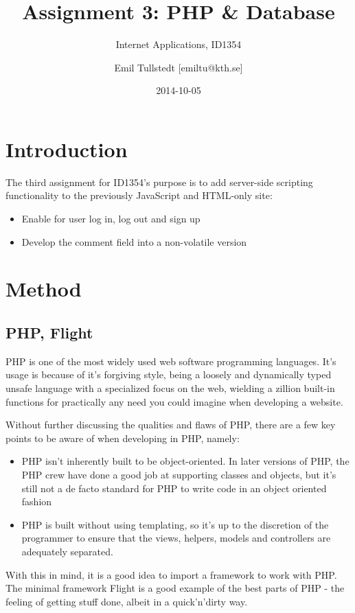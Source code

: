 \documentclass[a4paper]{scrartcl}
\title{Assignment 3: PHP \& Database}
\subtitle{Internet Applications, ID1354}
\author{Emil Tullstedt [emiltu@kth.se]}
\date{2014-10-05}
\begin{document}
\maketitle

\section{Introduction}

The third assignment for ID1354's purpose is to add server-side scripting functionality to the previously JavaScript and HTML-only site:

\begin{itemize}
\item Enable for user log in, log out and sign up
\item Develop the comment field into a non-volatile version
\end{itemize}

\section{Method}

\subsection{PHP, Flight}

PHP is one of the most widely used web software programming languages. It's usage is because of it's forgiving style, being a loosely and dynamically typed unsafe language with a specialized focus on the web, wielding a zillion built-in functions for practically any need you could imagine when developing a website.

Without further discussing the qualities and flaws of PHP, there are a few key points to be aware of when developing in PHP, namely:

\begin{itemize}
\item PHP isn't inherently built to be object-oriented. In later versions of PHP, the PHP crew have done a good job at supporting classes and objects, but it's still not a de facto standard for PHP to write code in an object oriented fashion
\item PHP is built without using templating, so it's up to the discretion of the programmer to ensure that the views, helpers, models and controllers are adequately separated.
\end{itemize}

With this in mind, it is a good idea to import a framework to work with PHP. The minimal framework Flight is a good example of the best parts of PHP - the feeling of getting stuff done, albeit in a quick'n'dirty way.
\end{document}
